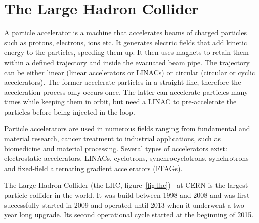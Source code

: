\section{The Large Hadron Collider}
\label{subsec:lhc}
A particle accelerator is a machine that accelerates beams of charged particles such as protons, electrons, ions etc. It generates electric fields that add kinetic energy to the particles, speeding them up. It then uses magnets to retain them within a defined trajectory and inside the evacuated beam pipe. The trajectory can be either linear (linear accelerators or LINACs) or circular (circular or cyclic accelerators). The former accelerate particles in a straight line, therefore the acceleration process only occurs once. The latter can accelerate particles many times while keeping them in orbit, but need a LINAC to pre-accelerate the particles before being injected in the loop.

Particle accelerators are used in numerous fields ranging from fundamental and material research, cancer treatment to industrial applications, such as biomedicine and material processing. Several types of accelerators exist: electrostatic accelerators, LINACs, cyclotrons, synchrocyclotrons, synchrotrons and fixed-field alternating gradient accelerators (FFAGs).

The Large Hadron Collider (the LHC, figure~\ref{fig:lhc})~\cite{Evans:1447127} at CERN is the largest particle collider in the world. It was build between 1998 and 2008 and was first successfully started in 2009 and operated until 2013 when it underwent a two-year long upgrade. Its second operational cycle started at the beginning of 2015.

